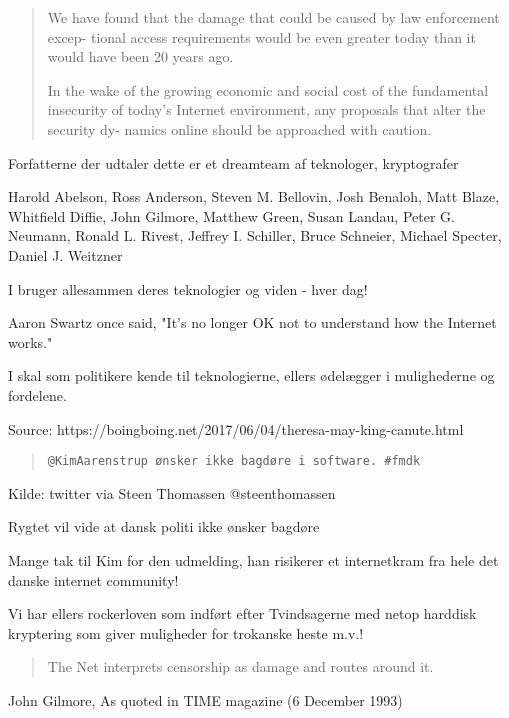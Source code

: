 \documentclass[20pt,landscape,a4paper,footrule]{foils}
\begin{document}
\begin{quote}
We have found that the damage that could be caused by law enforcement excep-
tional access requirements would be even greater today than it would have been 20
years ago.

In the wake of the growing economic and social cost of the fundamental
insecurity of today’s Internet environment, any proposals that alter the security dy-
namics online should be approached with caution.
\end{quote}

Forfatterne der udtaler dette er et dreamteam af teknologer, kryptografer

Harold Abelson, Ross Anderson, Steven M. Bellovin, Josh Benaloh, Matt Blaze,
Whitfield Diffie, John Gilmore, Matthew Green, Susan Landau, Peter G. Neumann,
Ronald L. Rivest, Jeffrey I. Schiller, Bruce Schneier, Michael Specter, Daniel J. Weitzner

I bruger allesammen deres teknologier og viden - hver dag!




Aaron Swartz once said, "It's no longer OK not to understand how the Internet works."

I skal som politikere kende til teknologierne, ellers ødelægger i mulighederne og fordelene.

Source:
https://boingboing.net/2017/06/04/theresa-may-king-canute.html



\begin{quote}
\verb+@KimAarenstrup ønsker ikke bagdøre i software. #fmdk+
\end{quote}
Kilde: twitter via Steen Thomassen @steenthomassen\\

Rygtet vil vide at dansk politi ikke ønsker bagdøre

Mange tak til Kim for den udmelding, han risikerer et internetkram
fra hele det danske internet community!

Vi har ellers rockerloven som indført efter Tvindsagerne med netop
harddisk kryptering som giver muligheder for trokanske heste m.v.!



\begin{quote}
  The Net interprets censorship as damage and routes around it.
\end{quote}
John Gilmore, As quoted in TIME magazine (6 December 1993)
\end{document}

